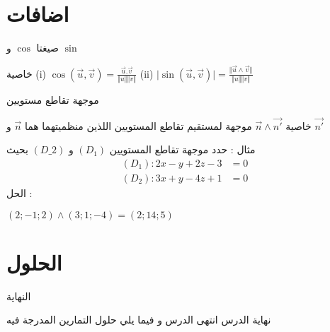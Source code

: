 \documentclass{beamer}
\begin{document}
\section{ اضافات}
\begin{frame}{صيغتا $ \cos$ و $ \sin $ }
	\begin{block}{خاصية}
		(i) $\cos(\overrightarrow{u},\overrightarrow{v})=\frac{\overrightarrow{u}.\overrightarrow{v}}{\Vert u \Vert \Vert v \Vert}$ 
		\hspace{2cm}(ii) $\vert \sin(\overrightarrow{u},\overrightarrow{v}) \vert=\frac{\Vert \overrightarrow{u} \wedge \overrightarrow{v} \Vert}{\Vert u \Vert \Vert v \Vert}$
	\end{block}
\end{frame}
\begin{frame}{موجهة تقاطع مستويين}
\begin{block}{خاصية}
	$\vec{n}\land \vec{n'}$
	موجهة لمستقيم تقاطع المستويين اللذين منظميتهما هما  
	$\vec{n}$ و $\vec{n'}$
\end{block}
مثال :
حدد موجهة تقاطع المستويين 
$ (D_1) $
و
$ (D\_2) $
بحيث 
\begin{align*}
(D_1):	2x-y+2z-3&=0 \\
(D_2):	3x+y-4z+1&=0
\end{align*}	
الحل :
\pause
\begin{block}{}
	$ (2;-1;2)\land (3;1;-4)=(2;14;5) $
\end{block}
\end{frame}
\section{ الحلول  } 
\begin{frame}{النهاية}
\begin{block}{نهاية الدرس}\huge
	انتهى الدرس و فيما يلي  حلول التمارين المدرجة فيه
\end{block}
	
\end{frame}




	
\end{document}
